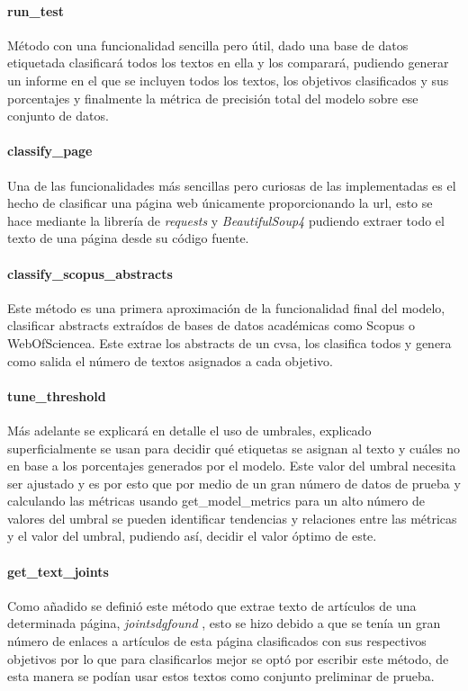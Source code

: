 \paragraph{run\_test} Método con una funcionalidad sencilla pero útil, dado una base de datos
etiquetada clasificará todos los textos en ella y los comparará, pudiendo
generar un informe en el que se incluyen todos los textos, los objetivos
clasificados y sus porcentajes y finalmente la métrica de precisión total del
modelo sobre ese conjunto de datos.

\paragraph{classify\_page} Una de las funcionalidades más sencillas pero curiosas de las
implementadas es el hecho de clasificar una página web únicamente proporcionando
la url, esto se hace mediante la librería de \textit{requests} y \textit{BeautifulSoup4} pudiendo
extraer todo el texto de una página desde su código fuente.

\paragraph{classify\_scopus\_abstracts} Este método es una primera aproximación de la
funcionalidad final del modelo, clasificar abstracts extraídos de bases de datos académicas como Scopus o \gls{WebOfSciencea}. Este extrae los abstracts de un \gls{cvsa}, los
clasifica todos y genera como salida el número de textos asignados a cada
objetivo.

\paragraph{tune\_threshold} Más adelante se explicará en detalle el uso de umbrales,
explicado superficialmente se usan para decidir qué etiquetas se asignan al
texto y cuáles no en base a los porcentajes generados por el modelo. Este valor
del umbral necesita ser ajustado y es por esto que por medio de un gran número
de datos de prueba y calculando las métricas usando get\_model\_metrics para un
alto número de valores del umbral se pueden identificar tendencias y relaciones
entre las métricas y el valor del umbral, pudiendo así, decidir el valor óptimo
de este.

\paragraph{get\_text\_joints} Como añadido se definió este método que extrae texto de
artículos de una determinada página, \textit{jointsdgfound} \cite{JointSDGFund}, esto se hizo debido a
que se tenía un gran número de enlaces a artículos de esta página clasificados
con sus respectivos objetivos por lo que para clasificarlos mejor se optó por
escribir este método, de esta manera se podían usar estos textos como conjunto
preliminar de prueba.

